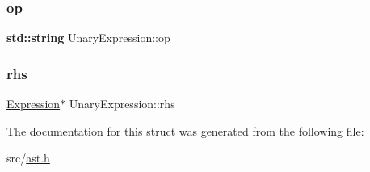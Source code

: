 \subsubsection{\texorpdfstring{op}{op}}
{\footnotesize\ttfamily \textbf{ std\+::string} Unary\+Expression\+::op}

\mbox{\label{struct_unary_expression_a53e53c6c0a0b76c46cb49a1fa48be5a5}} 
\subsubsection{\texorpdfstring{rhs}{rhs}}
{\footnotesize\ttfamily \hyperlink{struct_expression}{Expression}$\ast$ Unary\+Expression\+::rhs}



The documentation for this struct was generated from the following file\+:\begin{DoxyCompactItemize}
\item 
src/\hyperlink{ast_8h}{ast.\+h}\end{DoxyCompactItemize}
